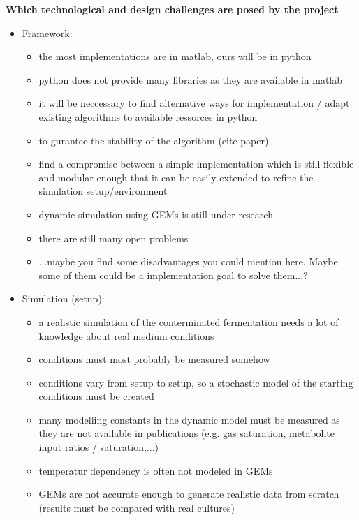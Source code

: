 \noindent
\textbf{Which technological and design challenges are posed by the project}

\begin{itemize}
 \item Framework:
 \begin{itemize}
  \item the most implementations are in matlab, ours will be in python
  \item python does not provide many libraries as they are available in matlab
  \item it will be neccessary to find alternative ways for implementation / adapt existing algorithms to available ressorces in python
  \item to gurantee the stability of the algorithm (cite paper)
  \item find a compromise between a simple implementation which is still flexible and modular enough that it can be easily extended to refine the simulation setup/environment
  \item dynamic simulation using GEMs is still under research
  \item there are still many open problems
  \item ...maybe you find some disadvantages you could mention here. Maybe some of them could be a implementation goal to solve them...?
 \end{itemize}
 \item Simulation (setup):
 \begin{itemize}
  \item a realistic simulation of the conterminated fermentation needs a lot of knowledge about real medium conditions
  \item conditions must most probably be measured somehow
  \item conditions vary from setup to setup, so a stochastic model of the starting conditions must be created
  \item many modelling constants in the dynamic model must be measured as they are not available in publications (e.g. gas saturation, metabolite input ratios / saturation,...)
  \item temperatur dependency is often not modeled in GEMs
  \item GEMs are not accurate enough to generate realistic data from scratch (results must be compared with real cultures)
 \end{itemize}
\end{itemize}
